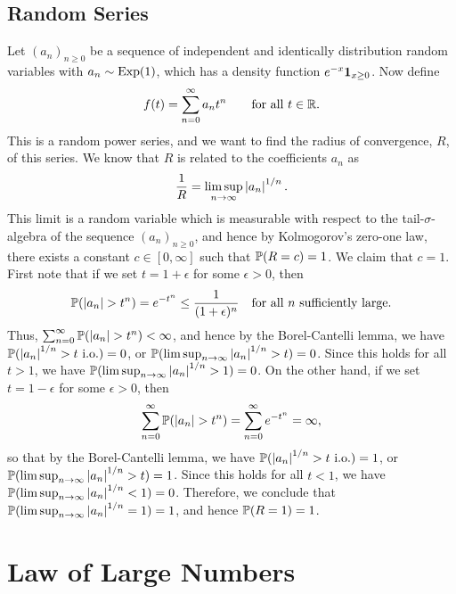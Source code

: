 \subsection{Random Series}
Let $(a_{n})_{n \geq 0}$ be a sequence of independent and identically distribution random variables with $a_{n} \sim \operatorname{Exp}(1)$, which has a density function $e^{-x}\textbf{1}_{x \geq 0}$. Now define
\begin{align}
    f(t) = \sum_{n=0}^{\infty} a_{n} t^{n} \qquad \text{for all } t \in \mathbb{R}.
\end{align}
This is a random power series, and we want to find the radius of convergence, $R$, of this series. We know that $R$ is related to the coefficients $a_{n}$ as
\begin{align}
    \frac{1}{R} = \limsup_{n \to \infty} \left| a_{n} \right|^{1/n}.
\end{align}
This limit is a random variable which is measurable with respect to the tail-$\sigma$-algebra of the sequence $(a_{n})_{n \geq 0}$, and hence by Kolmogorov's zero-one law, there exists a constant $c \in [0,\infty]$ such that $\mathbb{P}(R = c) = 1$. We claim that $c = 1$. First note that if we set $t = 1+\epsilon$ for some $\epsilon > 0$, then
\begin{align}
    \mathbb{P}(\left| a_{n} \right| > t^{n}) = e^{-t^{n}} \leq \frac{1}{(1+\epsilon)^{n}} \quad \text{for all } n \text{ sufficiently large}.
\end{align}
Thus, $\sum_{n=0}^{\infty} \mathbb{P}(\left| a_{n} \right| > t^{n}) < \infty$, and hence by the Borel-Cantelli lemma, we have $\mathbb{P}(\left| a_{n} \right|^{1/n} > t \text{ i.o.}) = 0$, or $\mathbb{P}(\limsup_{n \to \infty} \left| a_{n} \right|^{1/n} > t) = 0$. Since this holds for all $t > 1$, we have $\mathbb{P}(\limsup_{n \to \infty} \left| a_{n} \right|^{1/n} > 1) = 0$. On the other hand, if we set $t = 1-\epsilon$ for some $\epsilon > 0$, then 
\begin{align}
    \sum_{n=0}^{\infty} \mathbb{P}(\left| a_{n} \right| > t^{n}) = \sum_{n=0}^{\infty} e^{-t^{n}} = \infty,
\end{align}
so that by the Borel-Cantelli lemma, we have $\mathbb{P}(\left| a_{n} \right|^{1/n} > t \text{ i.o.}) = 1$, or $\mathbb{P}(\limsup_{n \to \infty} \left| a_{n} \right|^{1/n} > t) = 1$. Since this holds for all $t < 1$, we have $\mathbb{P}(\limsup_{n \to \infty} \left| a_{n} \right|^{1/n} < 1) = 0$. Therefore, we conclude that $\mathbb{P}(\limsup_{n \to \infty} \left| a_{n} \right|^{1/n} = 1) = 1$, and hence $\mathbb{P}(R = 1) = 1$.

\section{Law of Large Numbers}

